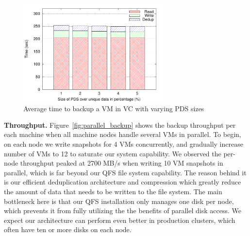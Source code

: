 \begin{figure}
    \centering
    \includegraphics[width=3in]{figures/single_backup_time}
    \caption{Average time to backup a VM in VC with varying PDS sizes}
    \label{fig:single_vm_backup}
\end{figure}


{\bf Throughput.}
Figure~\ref{fig:parallel_backup} shows the  backup throughput per each machine when all machine nodes 
handle  several VMs in parallel.
To begin, on each node we write snapshots for 4 VMs concurrently, and gradually 
increase number of VMs to 12 to saturate our system capability. We observed 
the per-node throughput peaked at 2700 MB/s when writing 10 VM snapshots in parallel, 
which is far beyond our QFS file system capability. The reason behind it is our efficient
deduplication architecture and compression which greatly reduce the amount of data that needs to be written to
the file system. The main bottleneck here is that our QFS installation only
manages one disk per node, which prevents it from fully utilizing the the
benefits of parallel disk access. We expect our architecture can
perform even better in production clusters, which often have ten or more disks on each node.



